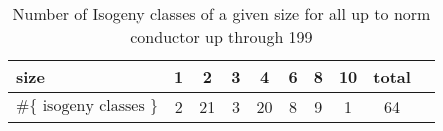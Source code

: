 \documentclass{amsart}
\begin{document}
\begin{center}
\begin{table}[h]
\caption{Number of Isogeny classes of a given size for all up to norm conductor up through 199\label{table:isogeny-sizes}}
\begin{tabular}{|l|c|c|c|c|c|c|c|c|c|}\hline
size                           & 1 & 2  & 3 & 4  & 6 & 8 & 10 & total \\ \hline
$\#\{\text{ isogeny classes }\}$ & 2 & 21 & 3 & 20 & 8 & 9 & 1  & 64 \\\hline
\end{tabular}
\end{table}
\end{center}



\end{document}
